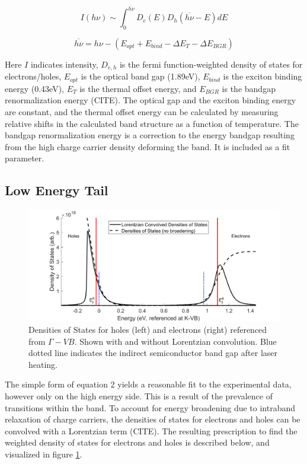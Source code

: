 \documentclass[aps,prl,preprint,superscriptaddress]{revtex4-2}
\begin{document}
\begin{equation} \label{PL Intensity}
I(h\nu) \sim \int_0^{\overline{h\nu}} D_e(E) D_h(\overline{h\nu} - E) dE
\end{equation}

\begin{equation} \label{Energy Offset}
\overline{h\nu} = h\nu - (E_{opt} + E_{bind} - \Delta E_T - \Delta E_{BGR})
\end{equation}

Here $I$ indicates intensity, $D_{e,h}$ is the fermi function-weighted density of states for electrons/holes, $E_{opt}$ is the optical band gap (1.89eV), $E_{bind}$ is the exciton binding energy (0.43eV), $E_T$ is the thermal offset energy, and $E_{BGR}$ is the bandgap renormalization energy (CITE). The optical gap and the exciton binding energy are constant, and the thermal offset energy can be calculated by measuring relative shifts in the calculated band structure as a function of temperature. The bandgap renormalization energy is a correction to the energy bandgap resulting from the high charge carrier density deforming the band. It is included as a fit parameter.


\subsection{Low Energy Tail}

\begin{figure}
	\includegraphics[width=1\linewidth]{fig_DOS.png}
	\caption{Densities of States for holes (left) and electrons (right) referenced from $\Gamma-VB$. Shown with and without Lorentzian convolution. Blue dotted line indicates the indirect semiconductor band gap after laser heating.}
	\label{fig:DOS}
\end{figure}

The simple form of equation 2 yields a reasonable fit to the experimental data, however only on the high energy side. This is a result of the prevalence of transitions within the band. To account for energy broadening due to intraband relaxation of charge carriers, the densities of states for electrons and holes can be convolved with a Lorentzian term (CITE). The resulting prescription to find the weighted density of states for electrons and holes is described below, and visualized in figure \ref{fig:DOS}.
\end{document}
